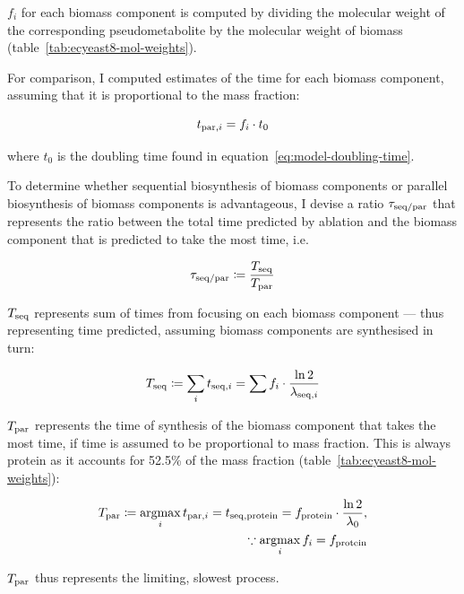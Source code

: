$f_{i}$ for each biomass component is computed by dividing the molecular weight of the corresponding pseudometabolite by the molecular weight of biomass (table~\ref{tab:ecyeast8-mol-weights}).

For comparison, I computed estimates of the time for each biomass component, assuming that it is proportional to the mass fraction:

\begin{equation}
  t_{\mathrm{par},i} = f_{i} \cdot t_{0}
  \label{eq:model-proportional-time}
\end{equation}

where $t_{0}$ is the doubling time found in equation~\ref{eq:model-doubling-time}.

To determine whether sequential biosynthesis of biomass components or parallel biosynthesis of biomass components is advantageous, I devise a ratio $\tau_{\mathrm{seq}/\mathrm{par}}$ that represents the ratio between the total time predicted by ablation and the biomass component that is predicted to take the most time, i.e.\

\begin{equation}
  \tau_{\mathrm{seq}/\mathrm{par}} \coloneqq \frac{T_{\mathrm{seq}}}{T_{\mathrm{par}}}
  \label{eq:model-ratio-simplified}
\end{equation}

$T_{\mathrm{seq}}$ represents sum of times from focusing on each biomass component --- thus representing time predicted, assuming biomass components are synthesised in turn:

\begin{equation}
  T_{\mathrm{seq}} \coloneqq \sum_{i} t_{\mathrm{seq},i} = \sum f_{i} \cdot \frac{\ln 2}{\lambda_{\mathrm{seq},i}}
  \label{eq:model-a}
\end{equation}

$T_{\mathrm{par}}$ represents the time of synthesis of the biomass component that takes the most time, if time is assumed to be proportional to mass fraction.
This is always protein as it accounts for 52.5\% of the mass fraction (table~\ref{tab:ecyeast8-mol-weights}):

\begin{equation}
  \begin{aligned}
    T_{\mathrm{par}} \coloneqq \operatorname*{argmax}_{i} t_{\mathrm{par},i} = t_{\mathrm{seq},\mathrm{protein}} = f_{\mathrm{protein}} \cdot \frac{\ln 2}{\lambda_{0}},\\
    \because \operatorname*{argmax}_{i} f_{i} = f_{\mathrm{protein}}
  \end{aligned}
  \label{eq:model-b}
\end{equation}

$T_{\mathrm{par}}$ thus represents the limiting, slowest process.

